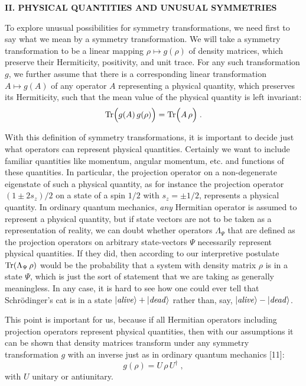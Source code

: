 \documentclass[12pt]{article}
\begin{document}
\vspace{20pt}

\begin{center}
{\bf II. PHYSICAL QUANTITIES AND UNUSUAL SYMMETRIES}
\end{center}



To explore  unusual possibilities for symmetry transformations, we need first to say what we mean by a symmetry transformation.  
We will take a symmetry transformation to be a linear mapping $\rho\mapsto g(\rho)$ of density matrices,  which preserve their Hermiticity, positivity,  and unit trace.  For any such transformation $g$, we further assume that there is a corresponding linear transformation $A\mapsto g(A)$ of any operator $A$ representing a physical quantity, which preserves its Hermiticity,  such that the mean value of the physical quantity is left invariant:
\begin{equation}
{\rm Tr} \Big(g(A)\,g(\rho)\Big)={\rm Tr} \Big(A\,\rho\Big)\;.
\end{equation}

With this definition of symmetry transformations, it is important to decide just what operators can represent physical quantities.  Certainly we want to include familiar quantities like momentum, angular momentum, etc. and functions of these quantities.  In particular, the projection operator on a non-degenerate eigenstate of such a physical quantity, as for instance the projection operator $(1\pm2s_z)/2$ on a state of a spin $1/2$ with $s_z=\pm 1/2$, represents a physical quantity.   In ordinary quantum mechanics, {\em any} Hermitian operator is assumed to represent a physical quantity, but if state vectors are not to be taken as a representation of reality, we can doubt whether  operators $\Lambda_\Psi$  that are defined  as the projection operators on arbitrary state-vectors $\Psi$  necessarily represent   physical quantities.  If they did, then according to our interpretive postulate ${\rm Tr}(\Lambda_\Psi\,\rho)$ would be the probability that a system with density matrix $\rho$ is in a state $\Psi$, which is just the sort of statement that we are taking as generally meaningless.  In any case, it is hard to see how one could ever tell that Schr\"{o}dinger's cat is in a state $|{\it alive}\rangle+|{\it dead}\rangle$ rather than, say, $|{\it alive}\rangle-|{\it dead}\rangle$.  

This point is important for us,  because  if all Hermitian operators including projection operators represent physical quantities, then with our assumptions it can be shown that density matrices transform under any symmetry transformation $g$ with an inverse just as in ordinary quantum mechanics [11]:
\begin{equation}
 g(\rho)=U\,\rho\,U^\dagger\;,
\end{equation}
with $U$ unitary or antiunitary.
\end{document}
